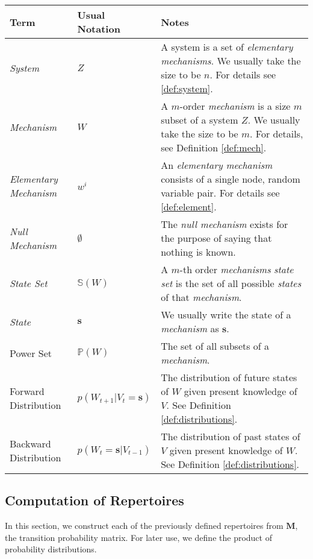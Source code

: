 \begin{tabularx}{\textwidth}{ll X}
	Term & Usual Notation & Notes \\
	\hline
	\endfirsthead
	\hline
	\endhead
	\endfoot
	\hline
	\caption{Key Definitions and Notation} 
	\label{tab:defs}
	\endlastfoot
	\textit{System} & $Z$ & A system is a set of \textit{elementary mechanisms}. We usually take the size to be $n$. For details see \ref{def:system}.\\
		\hline
	\textit{Mechanism} & $W$ & A $m$-order \textit{mechanism} is a size $m$  subset of a system $Z$. We usually take the size to be $m$. For details, see Definition \ref{def:mech}. \\
		\hline
	\textit{Elementary Mechanism} & $w^i$ & An \textit{elementary mechanism} consists of a single node, random variable pair. For details see \ref{def:element}.\\
		\hline
	\textit{Null Mechanism} & $\emptyset$ & The \textit{null mechanism} exists for the purpose of saying that nothing is known.\\
		\hline
	\textit{State Set} & $\mathbb{S}(W)$ & A $m$-th order \textit{mechanisms} \textit{state set} is the set of all possible \textit{states} of that \textit{mechanism}. \\
		\hline
	\textit{State} & $\mathbf{s}$ & We usually write the state of a \textit{mechanism} as $\mathbf{s}$.\\
		\hline
	Power Set & $\mathbb{P}(W)$ & The set of all subsets of a \textit{mechanism}.\\
		\hline
	Forward Distribution & $p(W_{t+1}|V_t=\mathbf{s})$ &The distribution of future states of $W$ given present knowledge of $V$. See Definition \ref{def:distributions}. \\
		\hline
	Backward Distribution & $p(W_{t}=\mathbf{s}|V_{t-1})$ & The distribution of past states of $V$ given present knowledge of $W$. See Definition \ref{def:distributions}.\\
\end{tabularx}









\subsection{Computation of Repertoires}
\label{sec:cost}
In this section, we construct each of the previously defined repertoires from $\mathbf{M}$, the transition probability matrix. For later use, we define the product of probability distributions.

